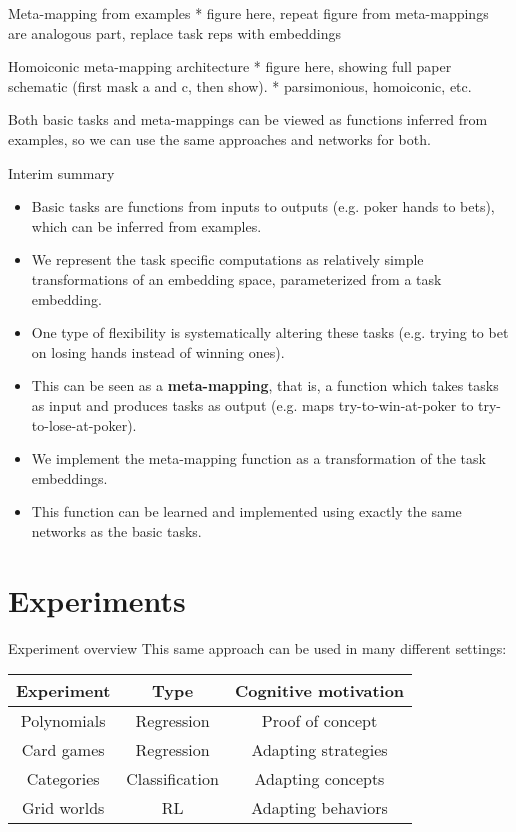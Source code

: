 \documentclass{beamer}
\begin{document}
\begin{frame}{Meta-mapping from examples}
* figure here, repeat figure from meta-mappings are analogous part, replace task reps with embeddings 
\end{frame}

\begin{frame}{Homoiconic meta-mapping architecture}
* figure here, showing full paper schematic (first mask a and c, then show). 
* parsimonious, homoiconic, etc.
\end{frame}

\begin{frame}[standout]
Both basic tasks and meta-mappings can be viewed as functions inferred from examples, so we can use the same approaches and networks for both.
\end{frame}

\begin{frame}{Interim summary}
\begin{itemize}
\item Basic tasks are functions from inputs to outputs (e.g. poker hands to bets), which can be inferred from examples.
\item We represent the task specific computations as relatively simple transformations of an embedding space, parameterized from a task embedding.
\item One type of flexibility is systematically altering these tasks (e.g. trying to bet on losing hands instead of winning ones).
\item This can be seen as a \textbf{meta-mapping}, that is, a function which takes tasks as input and produces tasks as output (e.g. maps try-to-win-at-poker to try-to-lose-at-poker).
\item We implement the meta-mapping function as a transformation of the task embeddings.
\item This function can be learned and implemented using exactly the same networks as the basic tasks.
\end{itemize}
\end{frame}

\section{Experiments}

\begin{frame}{Experiment overview}
This same approach can be used in many different settings: 
\begin{table}
\center
\begin{tabular}{|c|c|c|}
\hline
Experiment & Type & Cognitive motivation \\
\hline
Polynomials & Regression & Proof of concept \\
Card games & Regression & Adapting strategies \\
Categories & Classification & Adapting concepts \\
Grid worlds & RL & Adapting behaviors \\
\hline
\end{tabular}
\end{table}
\end{frame}
\end{document}
